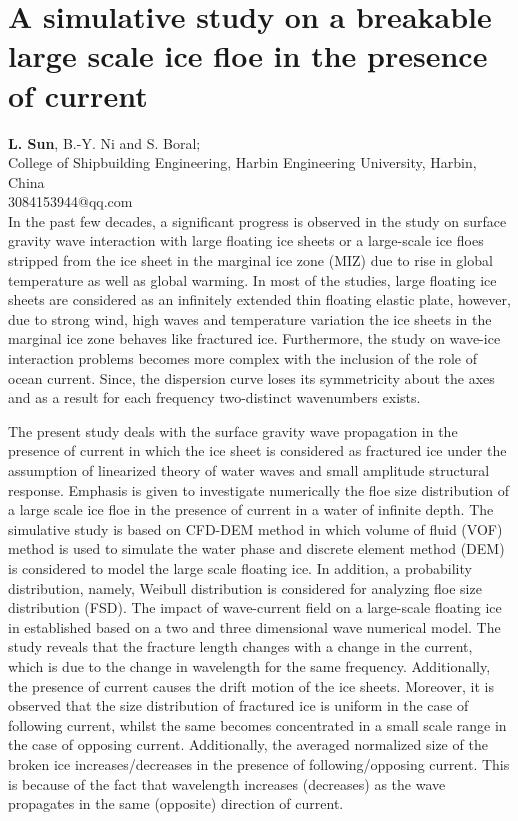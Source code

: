 \documentclass[9pt,a4paper,oneside]{book}
\numberwithin{equation}{section}
\begin{document}
\section*{A simulative study on a breakable large scale ice floe in the presence of current}
 \label{abs:19}
  {\bf L. Sun}, B.-Y. Ni and S. Boral;\\
College of Shipbuilding Engineering, Harbin Engineering University, Harbin, China\\
3084153944@qq.com\\

In the past few decades, a significant progress is observed in the study on surface gravity wave interaction with large floating ice sheets or a large-scale ice floes stripped from the ice sheet in the marginal ice zone (MIZ) due to rise in global temperature as well as global warming. In most of the studies, large floating ice sheets are considered as an infinitely extended thin floating elastic plate, however, due to strong wind, high waves and temperature variation the ice sheets in the marginal ice zone behaves like fractured ice. Furthermore, the study on wave-ice interaction problems becomes more complex with the inclusion of the role of ocean current. Since, the dispersion curve loses its symmetricity about the axes and as a result for each frequency two-distinct wavenumbers exists. 

The present study deals with the surface gravity wave propagation in the presence of current in which the ice sheet is considered as fractured ice under the assumption of linearized theory of water waves and small amplitude structural response.  Emphasis is given to investigate numerically the floe size distribution of a large scale ice floe in the presence of current in a water of infinite depth. The simulative study is based on CFD-DEM method in which volume of fluid (VOF) method is used to simulate the water phase and discrete element method (DEM) is considered to model the large scale floating ice. In addition, a probability distribution, namely, Weibull distribution is considered for analyzing floe size distribution (FSD). The impact of wave-current field on a large-scale floating ice in established based on a two and three dimensional wave numerical model. The study reveals that the fracture length changes with a change in the current, which is due to the change in wavelength for the same frequency. Additionally, the presence of current causes the drift motion of the ice sheets. Moreover, it is observed that the size distribution of fractured ice is uniform in the case of following current, whilst the same becomes concentrated in a small scale range in the case of opposing current. Additionally, the averaged normalized size of the broken ice increases/decreases in the presence of following/opposing current. This is because of the fact that wavelength increases (decreases) as the wave propagates in the same (opposite) direction of current.
\end{document}
